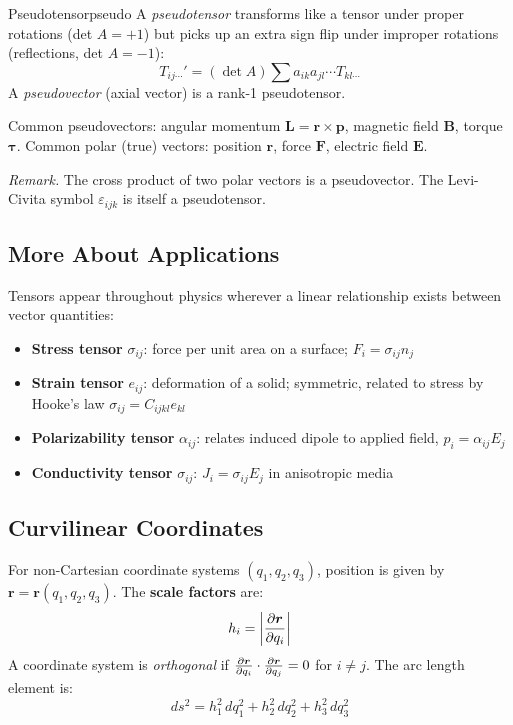 \documentclass[11pt, letterpaper]{article}
\theoremstyle{plain}
\newenvironment{remark}{\smallskip\noindent\textit{Remark.}}{\smallskip}
\newcommand{\vv}[1]{\bm{#1}}
\begin{document}
\begin{definition}{Pseudotensor}{pseudo}
    A \emph{pseudotensor} transforms like a tensor under proper rotations
    (det $A = +1$) but picks up an extra sign flip under improper rotations
    (reflections, det $A = -1$):
    \[
        T_{ij\cdots}' = (\det A)\sum a_{ik}a_{jl}\cdots T_{kl\cdots}
    \]
    A \emph{pseudovector} (axial vector) is a rank-1 pseudotensor.
\end{definition}

Common pseudovectors: angular momentum $\vv{L} = \vv{r}\times\vv{p}$,
magnetic field $\vv{B}$, torque $\vv{\tau}$. Common polar (true) vectors:
position $\vv{r}$, force $\vv{F}$, electric field $\vv{E}$.

\begin{remark}
    The cross product of two polar vectors is a pseudovector.
    The Levi-Civita symbol $\varepsilon_{ijk}$ is itself a pseudotensor.
\end{remark}


\subsection{More About Applications}

Tensors appear throughout physics wherever a linear relationship exists
between vector quantities:

\begin{itemize}
    \item \textbf{Stress tensor} $\sigma_{ij}$: force per unit area on a surface;
          $F_i = \sigma_{ij}n_j$
    \item \textbf{Strain tensor} $e_{ij}$: deformation of a solid;
          symmetric, related to stress by Hooke's law $\sigma_{ij} = C_{ijkl}e_{kl}$
    \item \textbf{Polarizability tensor} $\alpha_{ij}$: relates induced dipole
          to applied field, $p_i = \alpha_{ij}E_j$
    \item \textbf{Conductivity tensor} $\sigma_{ij}$: $J_i = \sigma_{ij}E_j$
          in anisotropic media
\end{itemize}


\subsection{Curvilinear Coordinates}

For non-Cartesian coordinate systems $(q_1, q_2, q_3)$, position is given
by $\vv{r} = \vv{r}(q_1, q_2, q_3)$. The \textbf{scale factors} are:
\[
    h_i = \left|\pdv{\vv{r}}{q_i}\right|
\]
A coordinate system is \emph{orthogonal} if $\pdv{\vv{r}}{q_i}\cdot\pdv{\vv{r}}{q_j} = 0$
for $i\neq j$. The arc length element is:
\[
    ds^2 = h_1^2\,dq_1^2 + h_2^2\,dq_2^2 + h_3^2\,dq_3^2
\]
\end{document}
